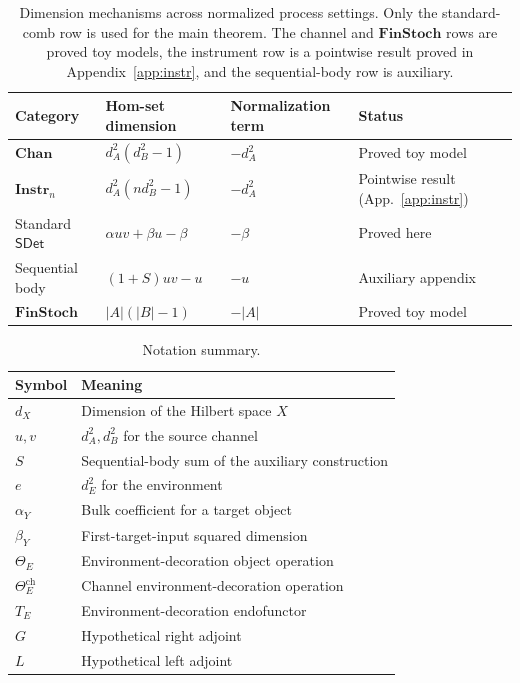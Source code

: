 \documentclass[11pt,a4paper]{article}
\theoremstyle{definition}
\theoremstyle{plain}
\theoremstyle{remark}
\newcommand{\SDet}{\mathsf{SDet}}
\begin{document}
\begin{table}[ht]
\centering
\begin{tabular}{llll}
\toprule
Category & Hom-set dimension & Normalization term & Status\\
\midrule
$\mathbf{Chan}$ & $d_A^2(d_B^2-1)$ & $-d_A^2$ & Proved toy model\\
$\mathbf{Instr}_n$ & $d_A^2(nd_B^2-1)$ & $-d_A^2$ & Pointwise result (App.~\ref{app:instr})\\
Standard $\SDet$ & $\alpha uv+\beta u-\beta$ & $-\beta$ & Proved here\\
Sequential body & $(1+S)uv-u$ & $-u$ & Auxiliary appendix\\
$\mathbf{FinStoch}$ & $|A|(|B|-1)$ & $-|A|$ & Proved toy model\\
\bottomrule
\end{tabular}
\caption{Dimension mechanisms across normalized process settings. Only the standard-comb row is used for the main theorem. The channel and $\mathbf{FinStoch}$ rows are proved toy models, the instrument row is a pointwise result proved in Appendix~\ref{app:instr}, and the sequential-body row is auxiliary.}
\label{tab:comparative}
\end{table}

\begin{table}[ht]
\centering
\begin{tabular}{ll}
\toprule
Symbol & Meaning\\
\midrule
$d_X$ & Dimension of the Hilbert space $X$\\
$u,v$ & $d_A^2,d_B^2$ for the source channel\\
$S$ & Sequential-body sum of the auxiliary construction\\
$e$ & $d_E^2$ for the environment\\
$\alpha_Y$ & Bulk coefficient for a target object\\
$\beta_Y$ & First-target-input squared dimension\\
$\Theta_E$ & Environment-decoration object operation\\
$\Theta_E^{\mathrm{ch}}$ & Channel environment-decoration operation\\
$T_E$ & Environment-decoration endofunctor\\
$G$ & Hypothetical right adjoint\\
$L$ & Hypothetical left adjoint\\
\bottomrule
\end{tabular}
\caption{Notation summary.}
\label{tab:notation}
\end{table}
\end{document}
